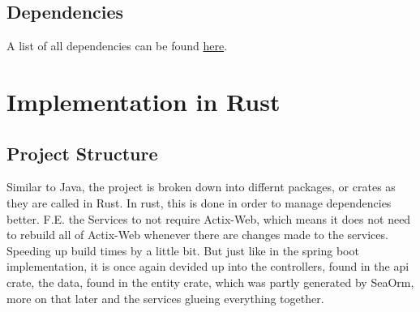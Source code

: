 \documentclass[a4paper,12pt]{article}
\begin{document}
	\subsection{Dependencies}
	A list of all dependencies can be found \href{https://github.com/casqan/actix-eval-mono/blob/develop/backend-spring/pom.xml}{here}.

	\section{Implementation in Rust}
	\label{sec:rust_implementation}
	\subsection{Project Structure}
	\label{subsec:project_structure_rust}
	\begin{minipage}{0.4\textwidth}
	\clearpage
	\end{minipage}%
	\begin{minipage}{0.6\textwidth}
		Similar to Java, the project is broken down into differnt packages, or crates as they are called
		in Rust. In rust, this is done in order to manage dependencies better. F.E. the Services to not
		require Actix-Web, which means it does not need to rebuild all of Actix-Web whenever there are
		changes made to the services. Speeding up build times by a little bit. But just like in the 
		spring boot implementation, it is once again devided up into the controllers, found in the api
		crate, the data, found in the entity crate, which was partly generated by SeaOrm, more on that
		later and the services glueing everything together.
	\end{minipage}%
\end{document}
